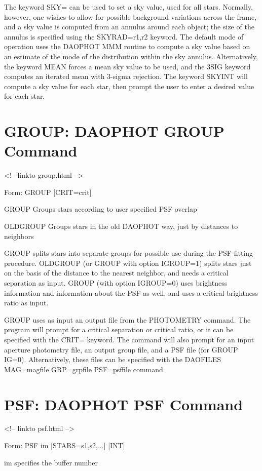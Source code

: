 The keyword SKY= can be used to set a sky value, used for all stars. Normally,
however, one wishes to allow for possible background variations across
the frame, and a sky value is computed from an annulus around each object;
the size of the annulus is specified using the SKYRAD=r1,r2 keyword.
The default mode of operation uses the DAOPHOT MMM routine to compute a
sky value based on an estimate of the mode of the distribution within the
sky annulus. Alternatively, the
keyword MEAN forces a mean sky value to be used,  and the 3SIG keyword
computes an iterated mean with 3-sigma rejection.
The keyword SKYINT will
compute a sky value for each star, then prompt the user to enter a desired 
value for each star. 

\section{GROUP: DAOPHOT GROUP Command}
\begin{rawhtml}
<!-- linkto group.html -->
\end{rawhtml}
\begin{command}
  \item[Form: GROUP {[CRIT=crit]}\hfill]{}
  \item[GROUP]{Groups stars according to user specified PSF overlap}
  \item[OLDGROUP]{Groups stars in the old DAOPHOT way, just by distances
to neighbors}
\end{command}

GROUP splits stars into separate groups for possible use during the
PSF-fitting procedure. OLDGROUP (or GROUP with option IGROUP=1) splits
stars just on the basis of the distance to the nearest neighbor, and
needs a critical separation as input. GROUP
(with option IGROUP=0) uses brightness information and information about
the PSF as well, and uses a critical brightness ratio as input.

GROUP uses as input an output file from
the PHOTOMETRY command. The program will prompt for a critical separation or
critical ratio, or it can be specified with the CRIT= keyword.  The command will
also prompt for an input aperture photometry file, an output group file,
and a PSF file (for GROUP IG=0).  Alternatively, these files can
be specified with the DAOFILES MAG=magfile GRP=grpfile PSF=psffile command.

\section{PSF: DAOPHOT PSF Command}
\begin{rawhtml}
<!-- linkto psf.html -->
\end{rawhtml}
\begin{command}
  \item[Form: PSF im {[STARS=s1,s2,...]} {[INT]}\hfill]{}
  \item[im]{specifies the buffer number}
\end{command}

